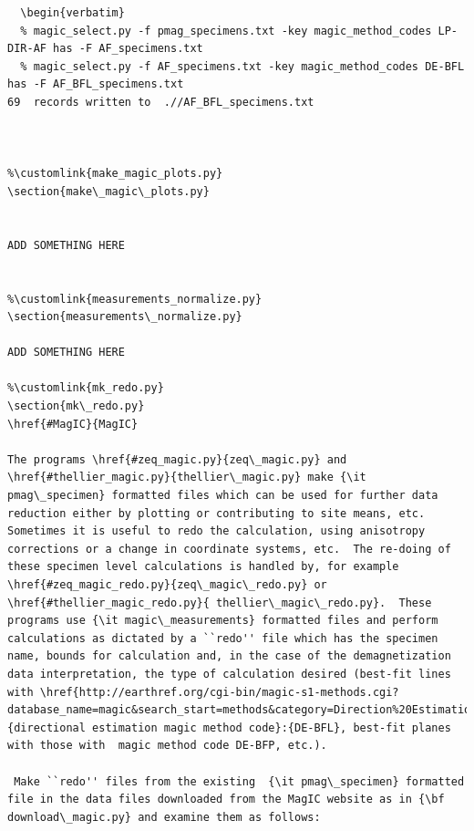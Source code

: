 \documentclass[11pt]{book}
\begin{document}
{{\begin{verbatim}
  \begin{verbatim}
  % magic_select.py -f pmag_specimens.txt -key magic_method_codes LP-DIR-AF has -F AF_specimens.txt
  % magic_select.py -f AF_specimens.txt -key magic_method_codes DE-BFL has -F AF_BFL_specimens.txt
69  records written to  .//AF_BFL_specimens.txt

  

%\customlink{make_magic_plots.py}
\section{make\_magic\_plots.py}


ADD SOMETHING HERE


%\customlink{measurements_normalize.py}
\section{measurements\_normalize.py}

ADD SOMETHING HERE

%\customlink{mk_redo.py}
\section{mk\_redo.py} 
\href{#MagIC}{MagIC}

The programs \href{#zeq_magic.py}{zeq\_magic.py} and \href{#thellier_magic.py}{thellier\_magic.py} make {\it pmag\_specimen} formatted files which can be used for further data reduction either by plotting or contributing to site means, etc.  Sometimes it is useful to redo the calculation, using anisotropy corrections or a change in coordinate systems, etc.  The re-doing of these specimen level calculations is handled by, for example \href{#zeq_magic_redo.py}{zeq\_magic\_redo.py} or \href{#thellier_magic_redo.py}{ thellier\_magic\_redo.py}.  These programs use {\it magic\_measurements} formatted files and perform calculations as dictated by a ``redo'' file which has the specimen name, bounds for calculation and, in the case of the demagnetization data interpretation, the type of calculation desired (best-fit lines with \href{http://earthref.org/cgi-bin/magic-s1-methods.cgi?database_name=magic&search_start=methods&category=Direction%20Estimation}{directional estimation magic method code}:{DE-BFL}, best-fit planes with those with  magic method code DE-BFP, etc.). 

 Make ``redo'' files from the existing  {\it pmag\_specimen} formatted file in the data files downloaded from the MagIC website as in {\bf download\_magic.py} and examine them as follows:


\end{verbatim}}}
\end{document}
